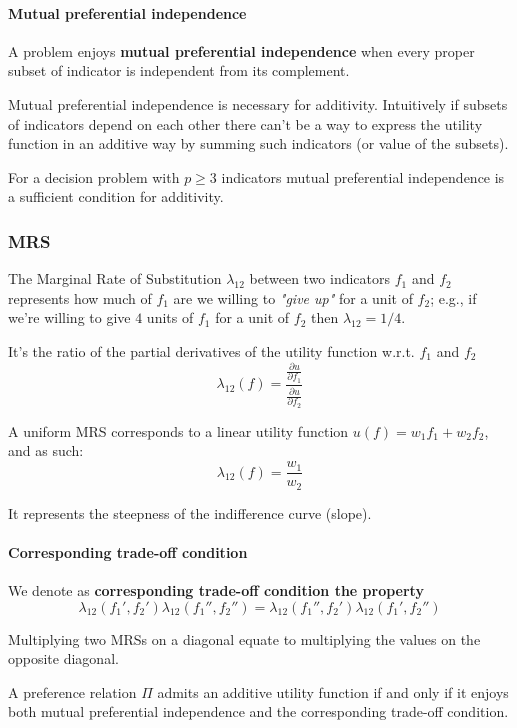 \paragraph{Mutual preferential independence} A problem enjoys \textbf{mutual preferential independence} when every proper subset of indicator is independent from its complement. 

Mutual preferential independence is necessary for additivity. Intuitively if subsets of indicators depend on each other there can't be a way to express the utility function in an additive way by summing such indicators (or value of the subsets).

For a decision problem with $p \geq 3$ indicators mutual preferential independence is a sufficient condition for additivity.

\subsubsection{MRS}

The Marginal Rate of Substitution $\lambda_{12}$ between two indicators $f_1$ and $f_2$ represents how much of $f_1$ are we willing to \textit{"give up"} for a unit of $f_2$; e.g., if we're willing to give $4$ units of $f_1$ for a unit of $f_2$ then $\lambda_{12} = 1/4$.

It's the ratio of the partial derivatives of the utility function w.r.t. $f_1$ and $f_2$
$$ \lambda_{12} (f) = \frac{ \frac{\partial u }{\partial f_1} }{ \frac{\partial u}{\partial f_2} } $$

A uniform MRS corresponds to a linear utility function $u(f) = w_1 f_1 + w_2 f_2$, and as such:
$$ \lambda_{12} (f) = \frac{w_1}{w_2} $$

It represents the steepness of the indifference curve (slope).

\paragraph{Corresponding trade-off condition} We denote as \textbf{corresponding trade-off condition the property}
$$ \lambda_{12} (f_1', f_2') \lambda_{12} (f_1'', f_2'') = \lambda_{12} (f_1'', f_2') \lambda_{12} (f_1', f_2'')$$

Multiplying two MRSs on a diagonal equate to multiplying the values on the opposite diagonal.

A preference relation $\Pi$ admits an additive utility function if and only if it enjoys both mutual preferential independence and the corresponding trade-off condition.

